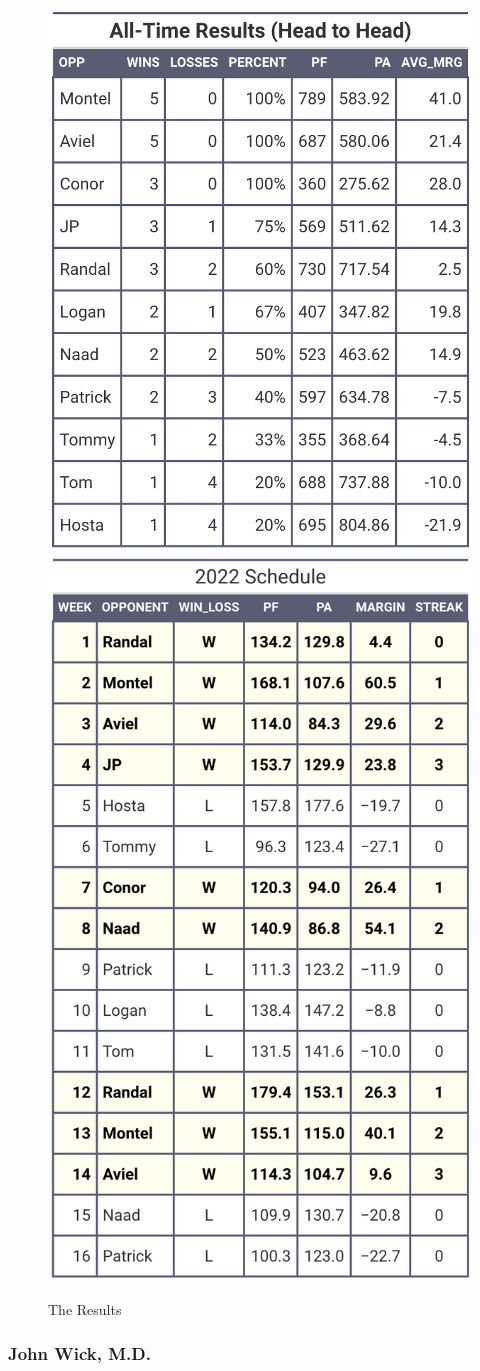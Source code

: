 \documentclass[
]{article}
\begin{document}
\begin{figure}
\includegraphics[width=0.5\linewidth,height=0.5\textheight]{output/headtohead/Zac_head_to_head} \includegraphics[width=0.5\linewidth,height=0.5\textheight]{output/py_schedule/season_results_Zac} \caption{The Results}\label{fig:unnamed-chunk-22}
\end{figure}

\hypertarget{john-wick-m.d.}{%
\subsubsection{John Wick, M.D.}\label{john-wick-m.d.}}
\end{document}
